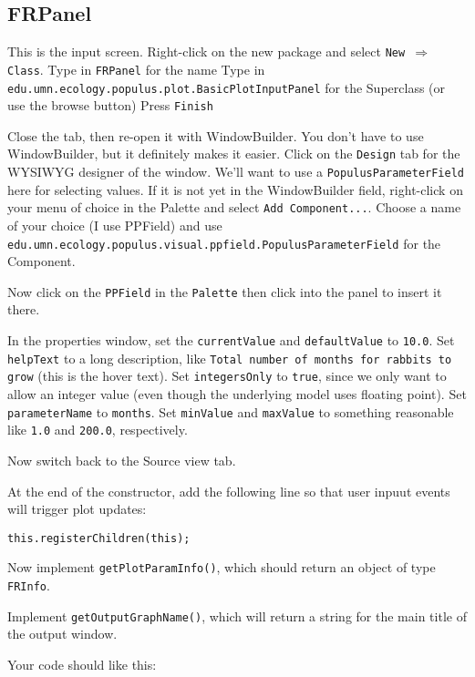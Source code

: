\documentclass[12pt]{article}
\begin{document}
\subsection{FRPanel}
This is the input screen.
Right-click on the new package and select \texttt{New $\Rightarrow$ Class}.
Type in \texttt{FRPanel} for the name
Type in \texttt{edu.umn.ecology.populus.plot.BasicPlotInputPanel} for the Superclass (or use the browse button)
Press \texttt{Finish}

Close the tab, then re-open it with WindowBuilder.  You don't have to use WindowBuilder, but it definitely makes it easier.
Click on the \texttt{Design} tab for the WYSIWYG designer of the window.
We'll want to use a \texttt{PopulusParameterField} here for selecting values.  If it is not yet in the WindowBuilder field, right-click on your menu of choice in the Palette and select \texttt{Add Component...}. Choose a name of your choice (I use PPField) and use \texttt{edu.umn.ecology.populus.visual.ppfield.PopulusParameterField} for the Component.


Now click on the \texttt{PPField} in the \texttt{Palette} then click into the panel to insert it there.

In the properties window, set the \texttt{currentValue} and \texttt{defaultValue} to \texttt{10.0}.  Set \texttt{helpText} to a long description, like \texttt{Total number of months for rabbits to grow} (this is the hover text).  Set \texttt{integersOnly} to \texttt{true}, since we only want to allow an integer value (even though the underlying model uses floating point).  Set \texttt{parameterName} to \texttt{months}.  Set \texttt{minValue} and \texttt{maxValue} to something reasonable like \texttt{1.0} and \texttt{200.0}, respectively.

Now switch back to the Source view tab.

At the end of the constructor, add the following line so that user inpuut events will trigger plot updates:

\texttt{this.registerChildren(this);}

Now implement \texttt{getPlotParamInfo()}, which should return an object of type \texttt{FRInfo}.

Implement \texttt{getOutputGraphName()}, which will return a string for the main title of the output window.

Your code should like this:
\end{document}
